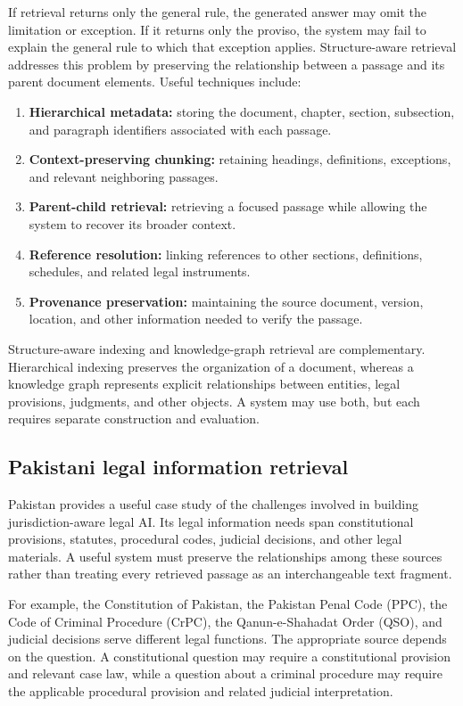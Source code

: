 If retrieval returns only the general rule, the generated answer may omit the limitation or exception.
If it returns only the proviso, the system may fail to explain the general rule to which that exception
applies. Structure-aware retrieval addresses this problem by preserving the relationship between a
passage and its parent document elements. Useful techniques include:
\begin{enumerate}[leftmargin=1.4em, itemsep=2pt, topsep=2pt]
\item \textbf{Hierarchical metadata:} storing the document, chapter, section, subsection, and paragraph
identifiers associated with each passage.
\item \textbf{Context-preserving chunking:} retaining headings, definitions, exceptions, and relevant
neighboring passages.
\item \textbf{Parent-child retrieval:} retrieving a focused passage while allowing the system to recover
its broader context.
\item \textbf{Reference resolution:} linking references to other sections, definitions, schedules, and
related legal instruments.
\item \textbf{Provenance preservation:} maintaining the source document, version, location, and other
information needed to verify the passage.
\end{enumerate}

Structure-aware indexing and knowledge-graph retrieval are complementary. Hierarchical indexing preserves
the organization of a document, whereas a knowledge graph represents explicit relationships between
entities, legal provisions, judgments, and other objects. A system may use both, but each requires
separate construction and evaluation.

\subsection{Pakistani legal information retrieval}

Pakistan provides a useful case study of the challenges involved in building jurisdiction-aware legal
AI. Its legal information needs span constitutional provisions, statutes, procedural codes, judicial
decisions, and other legal materials. A useful system must preserve the relationships among these
sources rather than treating every retrieved passage as an interchangeable text fragment.

For example, the Constitution of Pakistan, the Pakistan Penal Code (PPC), the Code of Criminal Procedure
(CrPC), the Qanun-e-Shahadat Order (QSO), and judicial decisions serve different legal functions. The
appropriate source depends on the question. A constitutional question may require a constitutional
provision and relevant case law, while a question about a criminal procedure may require the applicable
procedural provision and related judicial interpretation.


